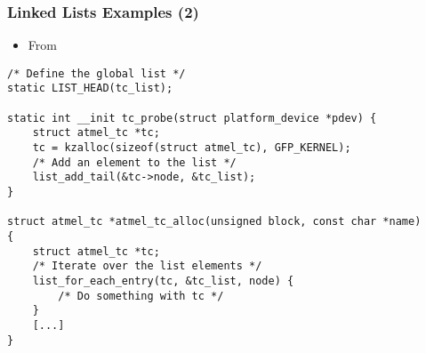 \begin{frame}[fragile]
  \frametitle{Linked Lists Examples (2)}
  \begin{itemize}
  \item From 
  \end{itemize}
\begin{verbatim}
/* Define the global list */
static LIST_HEAD(tc_list);

static int __init tc_probe(struct platform_device *pdev) {
    struct atmel_tc *tc;
    tc = kzalloc(sizeof(struct atmel_tc), GFP_KERNEL);
    /* Add an element to the list */
    list_add_tail(&tc->node, &tc_list);
}

struct atmel_tc *atmel_tc_alloc(unsigned block, const char *name)
{
    struct atmel_tc *tc;
    /* Iterate over the list elements */
    list_for_each_entry(tc, &tc_list, node) {
        /* Do something with tc */
    }
    [...]
}
\end{verbatim}
\end{frame}
